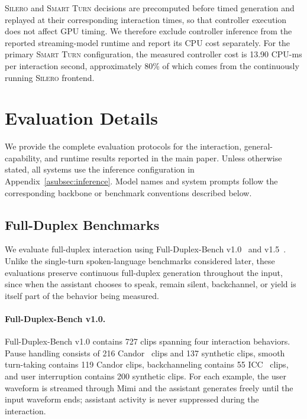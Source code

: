 \textsc{Silero} and \textsc{Smart Turn} decisions are precomputed before timed generation and replayed at their corresponding interaction times, so that controller execution does not affect GPU timing.
We therefore exclude controller inference from the reported streaming-model runtime and report its CPU cost separately.
For the primary \textsc{Smart Turn} configuration, the measured controller cost is 13.90 CPU-ms per interaction second, approximately 80\% of which comes from the continuously running \textsc{Silero} frontend.


\section{Evaluation Details}
\label{asec:evaluation_details}

We provide the complete evaluation protocols for the interaction, general-capability, and runtime results reported in the main paper.
Unless otherwise stated, all systems use the inference configuration in Appendix~\ref{asubsec:inference}.
Model names and system prompts follow the corresponding backbone or benchmark conventions described below.

\subsection{Full-Duplex Benchmarks}
\label{asubsec:full_duplex_benchmarks}

We evaluate full-duplex interaction using Full-Duplex-Bench v1.0~\citep{11433838} and v1.5~\citep{11463576}.
Unlike the single-turn spoken-language benchmarks considered later, these evaluations preserve continuous full-duplex generation throughout the input, since when the assistant chooses to speak, remain silent, backchannel, or yield is itself part of the behavior being measured.

\paragraph{Full-Duplex-Bench v1.0.}
Full-Duplex-Bench v1.0 contains 727 clips spanning four interaction behaviors.
Pause handling consists of 216 Candor~\citep{doi:10.1126/sciadv.adf3197} clips and 137 synthetic clips, smooth turn-taking contains 119 Candor clips, backchanneling contains 55 ICC~\citep{umair-etal-2024-large} clips, and user interruption contains 200 synthetic clips.
For each example, the user waveform is streamed through Mimi and the assistant generates freely until the input waveform ends; assistant activity is never suppressed during the interaction.

